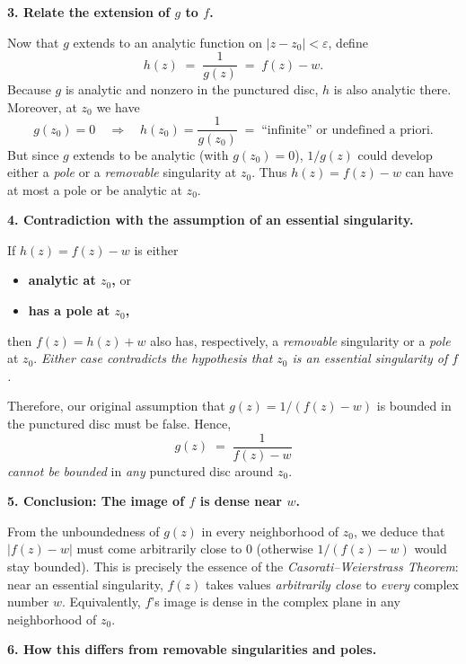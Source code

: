 \documentclass[12pt]{article}
\theoremstyle{definition} %
\theoremstyle{plain} %
\begin{document}
\medskip
\noindent
\textbf{3. Relate the extension of $g$ to $f$.}

Now that $g$ extends to an analytic function on $|z - z_0| < \varepsilon$, define
\[
h(z) \;=\; \frac{1}{g(z)} \;=\; f(z) - w.
\]
Because $g$ is analytic and nonzero in the punctured disc, $h$ is also analytic there. Moreover, at $z_0$ we have
\[
g(z_0) = 0 
\quad\Longrightarrow\quad 
h(z_0) = \frac{1}{g(z_0)} \;=\; \text{``infinite'' or undefined a priori}.
\]
But since $g$ extends to be analytic (with $g(z_0)=0$), $1/g(z)$ could develop either a \emph{pole} or a \emph{removable} singularity at $z_0$. Thus $h(z) = f(z) - w$ can have at most a pole or be analytic at $z_0$. 

\medskip
\noindent
\textbf{4. Contradiction with the assumption of an essential singularity.}

If $h(z) = f(z) - w$ is either
\begin{itemize}
\item \textbf{analytic at $z_0$,} or
\item \textbf{has a pole at $z_0$,}
\end{itemize}
then $f(z) = h(z) + w$ also has, respectively, a \emph{removable} singularity or a \emph{pole} at $z_0$. \emph{Either case contradicts the hypothesis that $z_0$ is an essential singularity of $f$.}

Therefore, our original assumption that $g(z) = 1/(f(z) - w)$ is bounded in the punctured disc must be false. Hence,
\[
g(z) \;=\; \frac{1}{f(z) - w}
\]
\emph{cannot be bounded} in \emph{any} punctured disc around $z_0$.

\medskip
\noindent
\textbf{5. Conclusion: The image of $f$ is dense near $w$.}

From the unboundedness of $g(z)$ in every neighborhood of $z_0$, we deduce that $|f(z) - w|$ must come arbitrarily close to $0$ (otherwise $1/(f(z)-w)$ would stay bounded). This is precisely the essence of the \emph{Casorati--Weierstrass Theorem}: near an essential singularity, $f(z)$ takes values \emph{arbitrarily close} to \emph{every} complex number $w$. Equivalently, $f$'s image is dense in the complex plane in any neighborhood of $z_0$.

\medskip
\noindent
\textbf{6. How this differs from removable singularities and poles.}
\end{document}
